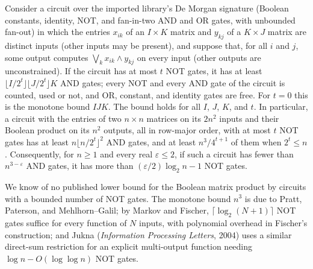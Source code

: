 \begin{theorem}
  \label{thm:lowerbounds-negation-limited-matrix}
  \leanok
  Consider a circuit over the imported library's De Morgan signature (Boolean
  constants, identity, NOT, and fan-in-two AND and OR gates, with unbounded
  fan-out) in which the entries $x_{ik}$ of an $I \times K$ matrix and $y_{kj}$
  of a $K \times J$ matrix are distinct inputs (other inputs may be present),
  and suppose that, for all $i$ and $j$, some output computes
  $\bigvee_k x_{ik} \wedge y_{kj}$ on every input (other outputs are
  unconstrained). If the circuit has at most $t$ NOT gates, it has at least
  $\lfloor I / 2^t \rfloor \lfloor J / 2^t \rfloor K$ AND gates; every NOT and
  every AND gate of the circuit is counted, used or not, and OR, constant, and
  identity gates are free. For $t = 0$ this is the monotone bound $IJK$. The
  bound holds for all $I$, $J$, $K$, and $t$. In particular, a circuit with the
  entries of two $n \times n$ matrices on its $2n^2$ inputs and their Boolean
  product on its $n^2$ outputs, all in row-major order, with at most $t$ NOT
  gates has at least $n \lfloor n / 2^t \rfloor^2$ AND gates, and at least
  $n^3 / 4^{t + 1}$ of them when $2^t \le n$. Consequently, for $n \ge 1$ and
  every real $\varepsilon \le 2$, if such a circuit has fewer than
  $n^{3 - \varepsilon}$ AND gates, it has more than
  $(\varepsilon / 2) \log_2 n - 1$ NOT gates.

  We know of no published lower bound for the Boolean matrix product by
  circuits with a bounded number of NOT gates. The monotone bound $n^3$ is due
  to Pratt, Paterson, and Mehlhorn--Galil; by Markov and Fischer,
  $\lceil \log_2 (N + 1) \rceil$ NOT gates suffice for every function of $N$
  inputs, with polynomial overhead in Fischer's construction; and Jukna
  (\emph{Information Processing Letters}, 2004) uses a similar direct-sum
  restriction for an explicit multi-output function needing
  $\log n - O(\log \log n)$ NOT gates.
\end{theorem}
